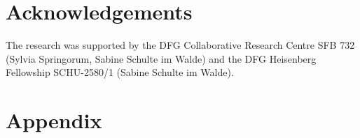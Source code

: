 \documentclass[output=paper]{langsci/langscibook}
\begin{document}
%
%
%
%


\section*{Acknowledgements}

The research was supported by the DFG Collaborative Research Centre
SFB 732 (Sylvia Springorum, Sabine Schulte im Walde) and the DFG
Heisenberg Fellowship SCHU-2580/1 (Sabine Schulte im Walde).



\vspace{+5mm}
{\sloppy
  \printbibliography[heading=subbibliography,notkeyword=this]
}


\clearpage
\section*{Appendix}
\end{document}
